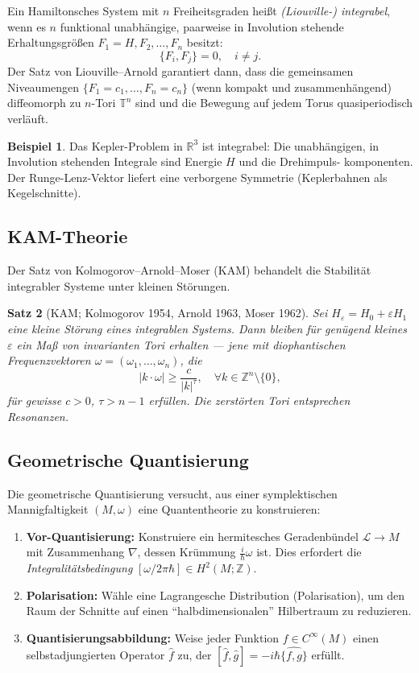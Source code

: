 \documentclass[12pt,a4paper]{amsart}
\newtheorem{theorem}{Satz}[section]
\theoremstyle{definition}
\newtheorem{beispiel}[theorem]{Beispiel}
\begin{document}
Ein Hamiltonsches System mit $n$ Freiheitsgraden heißt \emph{(Liouville-)
integrabel}, wenn es $n$ funktional unabhängige, paarweise in Involution
stehende Erhaltungsgrößen $F_1 = H, F_2, \ldots, F_n$ besitzt:
\[
  \{F_i, F_j\} = 0, \quad i \neq j.
\]
Der Satz von Liouville--Arnold garantiert dann, dass die gemeinsamen
Niveaumengen $\{F_1 = c_1, \ldots, F_n = c_n\}$ (wenn kompakt und
zusammenhängend) diffeomorph zu $n$-Tori $\mathbb{T}^n$ sind und die
Bewegung auf jedem Torus quasiperiodisch verläuft.

\begin{beispiel}
Das Kepler-Problem in $\mathbb{R}^3$ ist integrabel: Die unabhängigen,
in Involution stehenden Integrale sind Energie $H$ und die Drehimpuls-
komponenten.  Der Runge-Lenz-Vektor liefert eine verborgene Symmetrie
(Keplerbahnen als Kegelschnitte).
\end{beispiel}

\subsection{KAM-Theorie}

Der Satz von Kolmogorov--Arnold--Moser (KAM) behandelt die Stabilität
integrabler Systeme unter kleinen Störungen.

\begin{theorem}[KAM; Kolmogorov 1954, Arnold 1963, Moser 1962]
Sei $H_\varepsilon = H_0 + \varepsilon H_1$ eine kleine Störung eines
integrablen Systems.  Dann bleiben für genügend kleines $\varepsilon$ ein
Maß von invarianten Tori erhalten --- jene mit \emph{diophantischen}
Frequenzvektoren $\omega = (\omega_1, \ldots, \omega_n)$, die
\[
  |k \cdot \omega| \geq \frac{c}{|k|^\tau}, \quad \forall k \in \mathbb{Z}^n
  \setminus \{0\},
\]
für gewisse $c > 0$, $\tau > n-1$ erfüllen.  Die zerstörten Tori entsprechen
Resonanzen.
\end{theorem}

\subsection{Geometrische Quantisierung}

Die geometrische Quantisierung versucht, aus einer symplektischen Mannigfaltigkeit
$(M, \omega)$ eine Quantentheorie zu konstruieren:
\begin{enumerate}[label=(\arabic*)]
  \item \textbf{Vor-Quantisierung:} Konstruiere ein hermitesches Geradenbündel
    $\mathcal{L} \to M$ mit Zusammenhang $\nabla$, dessen Krümmung
    $\frac{i}{\hbar}\omega$ ist.  Dies erfordert die \emph{Integralitätsbedingung}
    $[\omega/2\pi\hbar] \in H^2(M; \mathbb{Z})$.
  \item \textbf{Polarisation:} Wähle eine Lagrangesche Distribution (Polarisation),
    um den Raum der Schnitte auf einen ``halbdimensionalen'' Hilbertraum zu
    reduzieren.
  \item \textbf{Quantisierungsabbildung:} Weise jeder Funktion $f \in C^\infty(M)$
    einen selbstadjungierten Operator $\hat{f}$ zu, der $[\hat{f}, \hat{g}]
    = -i\hbar \widehat{\{f,g\}}$ erfüllt.
\end{enumerate}
\end{document}
